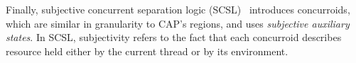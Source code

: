Finally, subjective concurrent separation logic
(SCSL)~\cite{scsl-esop14} introduces concurroids, which are similar in
granularity to CAP's regions, and uses \emph{subjective auxiliary
  states}. In SCSL, subjectivity refers to the fact that each
concurroid describes resource held either by the current thread or by
its environment.





